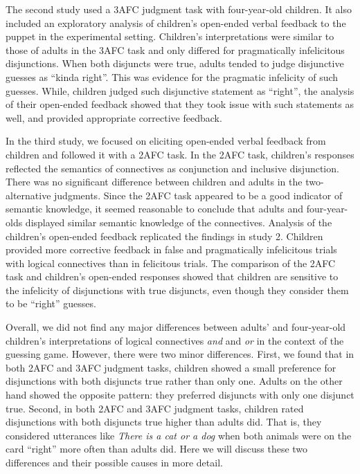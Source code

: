 \documentclass[floatsintext,man]{apa6}
\theoremstyle{definition}
\theoremstyle{definition}
\theoremstyle{definition}
\theoremstyle{remark}
\begin{document}
The second study used a 3AFC judgment task with four-year-old children.
It also included an exploratory analysis of children's open-ended verbal
feedback to the puppet in the experimental setting. Children's
interpretations were similar to those of adults in the 3AFC task and
only differed for pragmatically infelicitous disjunctions. When both
disjuncts were true, adults tended to judge disjunctive guesses as
\enquote{kinda right}. This was evidence for the pragmatic infelicity of
such guesses. While, children judged such disjunctive statement as
\enquote{right}, the analysis of their open-ended feedback showed that
they took issue with such statements as well, and provided appropriate
corrective feedback.

In the third study, we focused on eliciting open-ended verbal feedback
from children and followed it with a 2AFC task. In the 2AFC task,
children's responses reflected the semantics of connectives as
conjunction and inclusive disjunction. There was no significant
difference between children and adults in the two-alternative judgments.
Since the 2AFC task appeared to be a good indicator of semantic
knowledge, it seemed reasonable to conclude that adults and
four-year-olds displayed similar semantic knowledge of the connectives.
Analysis of the children's open-ended feedback replicated the findings
in study 2. Children provided more corrective feedback in false and
pragmatically infelicitous trials with logical connectives than in
felicitous trials. The comparison of the 2AFC task and children's
open-ended responses showed that children are sensitive to the
infelicity of disjunctions with true disjuncts, even though they
consider them to be \enquote{right} guesses.

Overall, we did not find any major differences between adults' and
four-year-old children's interpretations of logical connectives
\emph{and} and \emph{or} in the context of the guessing game. However,
there were two minor differences. First, we found that in both 2AFC and
3AFC judgment tasks, children showed a small preference for disjunctions
with both disjuncts true rather than only one. Adults on the other hand
showed the opposite pattern: they preferred disjuncts with only one
disjunct true. Second, in both 2AFC and 3AFC judgment tasks, children
rated disjunctions with both disjuncts true higher than adults did. That
is, they considered utterances like \emph{There is a cat or a dog} when
both animals were on the card \enquote{right} more often than adults
did. Here we will discuss these two differences and their possible
causes in more detail.
\end{document}
